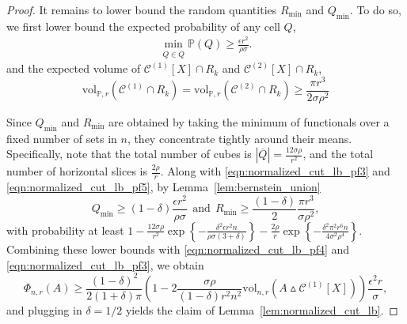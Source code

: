\documentclass[11pt,twoside]{article}
\newcommand{\set}[1]{\left\{#1\right\}}
\newcommand{\vol}{\mathrm{vol}}
\newcommand{\abs}[1]{\left \lvert #1 \right \rvert}
\newcommand{\1}{\mathbbm{1}}
\newcommand{\Xbf}{X}
\newcommand{\Pbb}{\mathbb{P}}
\newcommand{\Cset}{\mathcal{C}}
\begin{document}
\begin{proof}
	It remains to lower bound the random quantities $R_{\min}$ and $Q_{\min}$.
	To do so, we first lower bound the expected probability of any cell $Q$,
	\begin{align*}
	\min_{Q \in \overline{Q}} \Pbb(Q) \geq \frac{\epsilon r^2}{\rho \sigma}.
	\end{align*}
	and the expected volume of $\Cset^{(1)}[\Xbf] \cap R_k$ and $\Cset^{(2)}[\Xbf] \cap R_k$,
	\begin{equation}
	\vol_{\Pbb,r}(\Cset^{(1)} \cap R_k) = \vol_{\Pbb,r}(\Cset^{(2)} \cap R_k) \geq \frac{\pi r^3}{2 \sigma \rho^2} \label{eqn:normalized_cut_lb_pf5}
	\end{equation}
	
	Since $Q_{\min}$ and $R_{\min}$ are obtained by taking the minimum of functionals over a fixed number of sets in $n$, they concentrate tightly around their means. Specifically, note that the total number of cubes is $\abs{\overline{Q}} = \frac{12 \sigma \rho}{r^2}$, and the total number of horizontal slices is $\frac{2\rho}{r}$. Along with \eqref{eqn:normalized_cut_lb_pf3} and \eqref{eqn:normalized_cut_lb_pf5}, by Lemma~\ref{lem:bernstein_union} 
	\begin{equation*}
	Q_{\min} \geq (1 - \delta)\frac{\epsilon r^2}{\rho \sigma} ~~\textrm{and}~~ R_{\min} \geq \frac{(1 - \delta)}{2}\frac{\pi r^3}{\sigma \rho^2 },
	\end{equation*}
	with probability at least $1 - \frac{12\sigma \rho}{r^2} \exp\set{-\frac{\delta^2\epsilon r^2 n}{\rho \sigma(3 + \delta)}} - \frac{2\rho}{r}\exp\set{-\frac{\delta^2\pi^2 r^6n}{4\sigma^2\rho^4}}$. Combining these lower bounds with \eqref{eqn:normalized_cut_lb_pf4} and \eqref{eqn:normalized_cut_lb_pf3}, we obtain
	\begin{equation*}	
	\Phi_{n,r}(A) \geq \frac{(1 - \delta)^2}{2(1 + \delta)\pi} \left(1 - 2 \frac{\sigma \rho}{(1 - \delta) r^2 n^2} \vol_{n,r}(A \vartriangle \Cset^{(1)}[\Xbf]) \right) \frac{\epsilon^2 r}{\sigma},
	\end{equation*}
	and plugging in $\delta = 1/2$ yields the claim of Lemma~\ref{lem:normalized_cut_lb}.
\end{proof}
\end{document}
